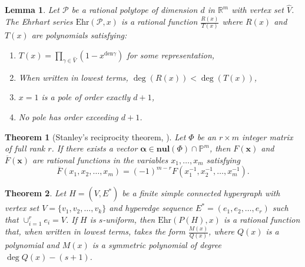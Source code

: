 \documentclass[10pt,a4paper]{amsart}
\newtheorem{lem}{Lemma}
\newtheorem{thm}{Theorem}
\begin{document}
\begin{lem}\cite{Ehrhart62}\label{Ehrhartpoled+1}
Let $\mathcal{P}$ be a rational polytope of dimension $d$ in $\mathbb{R}^m$ with vertex set $\widehat{V}$. The Ehrhart series $\mathrm{Ehr}(\mathcal{P},x)$ is a rational function $\frac{R(x)}{T(x)}$ where $R(x)$ and $T(x)$ are polynomials satisfying:
\begin{enumerate}
    \item $T(x) = \prod_{\gamma \in \widehat{V}} (1 - x^{\text{den}\gamma})$ for some representation,
    \item When written in lowest terms, $\deg(R(x)) < \deg(T(x))$,
    \item $x=1$ is a pole of order exactly $d+1$,
    \item No pole has order exceeding $d+1$.
\end{enumerate}
\end{lem}

\begin{thm}[Stanley's reciprocity theorem, \cite{StanleyMagic73}]\label{StanleyReciprocity}
Let $\Phi$ be an $r \times m$ integer matrix of full rank $r$. If there exists a vector $\boldsymbol{\alpha} \in \mathbf{nul}(\Phi) \cap \mathbb{P}^m$, then $F(\mathbf{x})$ and $\overline{F}(\mathbf{x})$ are rational functions in the variables $x_1, \dots, x_m$ satisfying
\[
\overline{F}(x_1, x_2, \ldots, x_m) = (-1)^{m-r} F(x_1^{-1}, x_2^{-1}, \ldots, x_m^{-1}).
\]
\end{thm}

\begin{thm}\label{UniformHyperGr}
Let $H=(V,E^*)$ be a finite simple connected hypergraph with vertex set $V=\{v_1,v_2,\ldots, v_k\}$ and hyperedge sequence $E^*=(e_1,e_2,\ldots,e_r)$ such that $\cup_{i=1}^r e_i=V$. If $H$ is $s$-uniform, then $\mathrm{Ehr}(P(H),x)$ is a rational function that, when written in lowest terms, takes the form $\frac{M(x)}{Q(x)}$, where $Q(x)$ is a polynomial and $M(x)$ is a symmetric polynomial of degree $\deg Q(x) - (s+1)$.
\end{thm}
\end{document}
